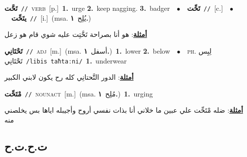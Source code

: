 \documentclass[10pt,a4paper,twoside]{article} %
\begin{document}
\begin{multicols}{2}
{\setlength\topsep{0pt}\textbf{\foreignlanguage{arabic}{تَحَّت}}\ {\color{gray}\texttt{//}\color{black}}\ \textsc{verb}\ [p.]\ \textbf{1.}~urge  \textbf{2.}~keep nagging.  \textbf{3.}~badger\ \ $\bullet$\ \ \setlength\topsep{0pt}\textbf{\foreignlanguage{arabic}{تَحِّت}}\ {\color{gray}\texttt{//}\color{black}}\ [c.]\ \ $\bullet$\ \ \setlength\topsep{0pt}\textbf{\foreignlanguage{arabic}{يتَحِّت}}\ {\color{gray}\texttt{//}\color{black}}\ [i.]\ \color{gray}(msa. \foreignlanguage{arabic}{يُلِح}~\foreignlanguage{arabic}{\textbf{١.}})\color{black}\  \begin{flushright}\color{gray}\foreignlanguage{arabic}{\textbf{\underline{\foreignlanguage{arabic}{أمثلة}}}: هو أنا بصراحة تَحَّتِت عليه شوي قام هو زعل}\end{flushright}\color{black}} \vspace{2mm}

{\setlength\topsep{0pt}\textbf{\foreignlanguage{arabic}{تَحْتَانِي}}\ {\color{gray}\texttt{//}\color{black}}\ \textsc{adj}\ [m.]\ \color{gray}(msa. \foreignlanguage{arabic}{أسفل}~\foreignlanguage{arabic}{\textbf{١.}})\color{black}\ \textbf{1.}~lower  \textbf{2.}~below\ \ $\bullet$\ \ \textsc{ph.} \color{gray} \foreignlanguage{arabic}{لِبِس تَحْتَانِي}\color{black}\ {\color{gray}\texttt{/{\sffamily libis taħtaːni}/}\color{black}}\ \textbf{1.}~underwear\  \begin{flushright}\color{gray}\foreignlanguage{arabic}{\textbf{\underline{\foreignlanguage{arabic}{أمثلة}}}: الدور التَّحتانِي كله رح يكون لابني الكبير}\end{flushright}\color{black}} \vspace{2mm}

{\setlength\topsep{0pt}\textbf{\foreignlanguage{arabic}{مْتَحِّت}}\ {\color{gray}\texttt{//}\color{black}}\ \textsc{noun\textunderscore act}\ [m.]\ \color{gray}(msa. \foreignlanguage{arabic}{مُلِح}~\foreignlanguage{arabic}{\textbf{١.}})\color{black}\ \textbf{1.}~urging\  \begin{flushright}\color{gray}\foreignlanguage{arabic}{\textbf{\underline{\foreignlanguage{arabic}{أمثلة}}}: ضله مْتَحِّت علي عبين ما خلاني أنا بذات نفسي أروح وأجيبله اياها بس يخلصني منه}\end{flushright}\color{black}} \vspace{2mm}

\vspace{-3mm}
\subsection*{\color{blue}\foreignlanguage{arabic}{ت.ح.ت.ح}\color{blue}{ (ntws)}} 


\end{multicols}
\end{document}
